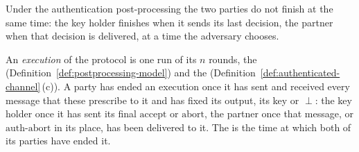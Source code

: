 
Under the authentication post-processing the two parties do not finish at
the same time: the key holder finishes when it sends its last decision, the
partner when that decision is delivered, at a time the adversary chooses.

\begin{definition}\label{def:execution-end}
An \emph{execution} of the protocol is one run of its $n$ rounds, the
(Definition~\ref{def:postprocessing-model}) and the
(Definition~\ref{def:authenticated-channel}\,(c)). A party has ended an
execution once it has sent and received every message that these prescribe
to it and has fixed its output, its key or $\perp$: the key holder once it
has sent its final $\mathrm{accept}$ or $\mathrm{abort}$, the partner once
that message, or $\mathrm{auth\text{-}abort}$ in its place, has been
delivered to it. The
is the time at which both of its parties have ended it.
\end{definition}
